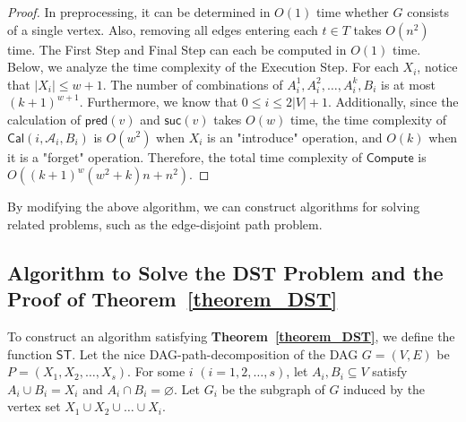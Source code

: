 \documentclass[runningheads]{llncs}
\theoremstyle{plain}
\theoremstyle{definition}
\begin{document}
\begin{proof}
    In preprocessing, it can be determined in $O(1)$ time whether $G$ consists of a single vertex. Also, removing all edges entering each $t \in T$ takes $O(n^2)$ time. The First Step and Final Step can each be computed in $O(1)$ time. Below, we analyze the time complexity of the Execution Step. For each $X_i$, notice that $|X_i| \leq w+1$. The number of combinations of $A^1_i, A^2_i, \dots, A^k_i, B_i$ is at most $(k+1)^{w+1}$. Furthermore, we know that $0 \leq i \leq 2|V|+1$. Additionally, since the calculation of $\mathsf{pred}(v)$ and $\mathsf{suc}(v)$ takes $O(w)$ time, the time complexity of $\mathsf{Cal}(i, \mathscr{A}_i, B_i)$ is $O(w^2)$ when $X_i$ is an "introduce" operation, and $O(k)$ when it is a "forget" operation. Therefore, the total time complexity of $\mathsf{Compute}$ is $O((k+1)^w(w^2+k)n+n^2)$.
\end{proof}

By modifying the above algorithm, we can construct algorithms for solving related problems, such as the edge-disjoint path problem.






\subsection{Algorithm to Solve the DST Problem and the Proof of \textbf{Theorem~\ref{theorem_DST}}}\label{appendix_B7}

To construct an algorithm satisfying \textbf{Theorem~\ref{theorem_DST}}, we define the function $\mathsf{ST}$. Let the nice DAG-path-decomposition of the DAG $G = (V, E)$ be $P = (X_1, X_2, \dots, X_s)$. For some $i$ $(i = 1, 2, \dots, s)$, let $A_i, B_i \subseteq V$ satisfy $A_i \cup B_i = X_i$ and $A_i \cap B_i = \varnothing$. Let $G_i$ be the subgraph of $G$ induced by the vertex set $X_1 \cup X_2 \cup \dots \cup X_i$.
\end{document}
